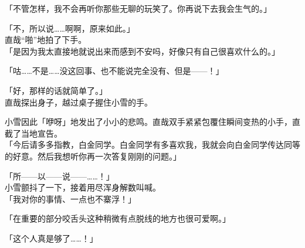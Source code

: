 「不管怎样，我不会再听你那些无聊的玩笑了。你再说下去我会生气的。」

「不，所以说……啊啊，原来如此。」\\

直哉“啪”地拍了下手。\\

「是因为我太直接地就说出来而感到不安吗，好像只有自己很喜欢什么的。」

「咕……不是……没这回事、也不能说完全没有、但是——！」

「好，那样的话就简单了。」\\

直哉探出身子，越过桌子握住小雪的手。

小雪因此「咿呀」地发出了小小的悲鸣。直哉双手紧紧包覆住瞬间变热的小手，直截了当地宣告。\\

「今后请多多指教，白金同学。白金同学有多喜欢我，我就会向白金同学传达同等的好意。然后我想听你再一次答复刚刚的问题。」

「所——以——说——……！」\\

小雪颤抖了一下，接着用尽浑身解数叫喊。\\

「我对你的事情、一点也不寨浮！」

「在重要的部分咬舌头这种稍微有点脱线的地方也很可爱啊。」

「这个人真是够了……！」
